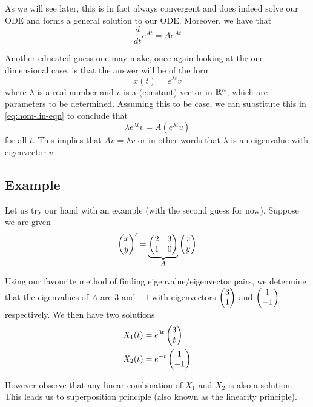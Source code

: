 As we will see later, this is in fact always convergent and does indeed solve our ODE and forms a general solution to our ODE. Moreover, we have that
$$ \frac{d}{dt} e^{At} = A e^{At} $$

Another educated guess one may make, once again looking at the one-dimensional case, is that the answer will be of the form
$$ x(t) = e^{\lambda t} v $$
where $\lambda$ is a real number and $v$ is a (constant) vector in $\mathbb{R}^n$, which are parameters to be determined. Assuming this to be case, we can substitute this in \autoref{eq:hom-lin-eqn} to conclude that
$$ \lambda e^{\lambda t} v = A (e^{\lambda t} v) $$
for all $t$.
This implies that $Av = \lambda v$ or in other words that $\lambda$ is an eigenvalue with eigenvector $v$.

\subsection{Example}
Let us try our hand with an example (with the second guess for now).
Suppose we are given
\begin{equation}\label{eq:lin-eqn-eg}
    \begin{pmatrix} x\\y \end{pmatrix}' = \underbrace{\begin{pmatrix} 2 & 3\\1 & 0 \end{pmatrix}}_{A} \begin{pmatrix} x\\y \end{pmatrix}
\end{equation}

Using our favourite method of finding eigenvalue/eigenvector pairs, we determine that the eigenvalues of $A$ are $3$ and $-1$ with eigenvectors $\begin{pmatrix} 3\\1 \end{pmatrix}$ and $\begin{pmatrix} 1\\-1 \end{pmatrix}$ respectively. We then have two solutions
\begin{align*}
    X_1(t) &= e^{3t}\begin{pmatrix} 3\\t \end{pmatrix}\\
    X_2(t) &= e^{-t}\begin{pmatrix} 1\\-1 \end{pmatrix}
\end{align*}

However observe that any linear combination of $X_1$ and $X_2$ is also a solution. This leads us to superposition principle (also known as the linearity principle).

